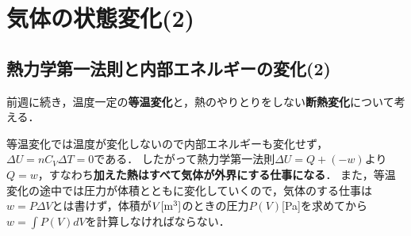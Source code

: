 \section{気体の状態変化(2)}

\setcounter{nombre}{10}

\subsection{熱力学第一法則と内部エネルギーの変化(2)}
前週に続き，温度一定の{\bf 等温変化}と，熱のやりとりをしない{\bf 断熱変化}について考える．

等温変化では温度が変化しないので内部エネルギーも変化せず，$\Delta U=nC_V\Delta T=0$である．
したがって熱力学第一法則$\Delta U=Q+(-w)$より$Q=w$，すなわち{\bf 加えた熱はすべて気体が外界にする仕事になる}．
また，等温変化の途中では圧力が体積とともに変化していくので，気体のする仕事は$w=P\Delta V$とは書けず，体積が$V[{\rm m^3}]$のときの圧力$P(V)$[Pa]を求めてから$w=\displaystyle\int P(V)dV$を計算しなければならない．

